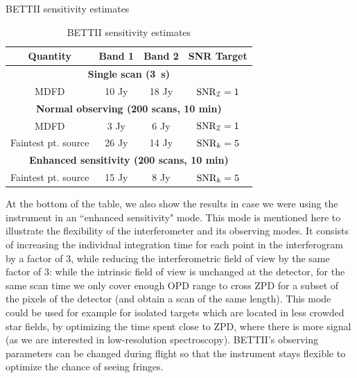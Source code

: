 \begin{table}[ht!]
\begin{center}
\caption{BETTII sensitivity estimates}
\label{tab:BETTIIsensitivity2}
\vspace{-0.5cm}
\begin{longtable}{cccc}
\toprule
  Quantity   & Band 1 &  Band 2 & SNR Target \\
     \midrule 
 \multicolumn{4}{c}{\textbf{Single scan (\SI{3}{\second})}} \\
MDFD & 10 Jy  & 18 Jy & $\textrm{SNR}_{\mathcal{I}} = 1$\\ 
\midrule
\multicolumn{4}{c}{\textbf{Normal observing (200 scans, 10 min)}} \\
MDFD & 3 Jy  & 6 Jy & $\textrm{SNR}_{\mathcal{I}} = 1$\\ 
Faintest pt. source & 26 Jy  & 14 Jy & $\textrm{SNR}_k = 5$\\ 
\midrule
\multicolumn{4}{c}{\textbf{Enhanced sensitivity (200 scans, 10 min)}} \\
\midrule
Faintest pt. source & 15 Jy  & 8 Jy & $\textrm{SNR}_k = 5$\\ 
\bottomrule 
\end{longtable} 
\caption{BETTII sensitivity estimates}
\label{tab:sensitivity}
\end{center}
\end{table} 


At the bottom of the table, we also show the results in case we were using the instrument in an ``enhanced sensitivity" mode. This mode is mentioned here to illustrate the flexibility of the interferometer and its observing modes. It consists of increasing the individual integration time for each point in the interferogram by a factor of 3, while reducing the interferometric field of view by the same factor of 3: while the intrinsic field of view is unchanged at the detector, for the same scan time we only cover enough OPD range to cross ZPD for a subset of the pixels of the detector (and obtain a scan of the same length). This mode could be used for example for isolated targets which are located in less crowded star fields, by optimizing the time spent close to ZPD, where there is more signal (as we are interested in low-resolution spectroscopy). BETTII's observing parameters can be changed during flight so that the instrument stays flexible to optimize the chance of seeing fringes.

